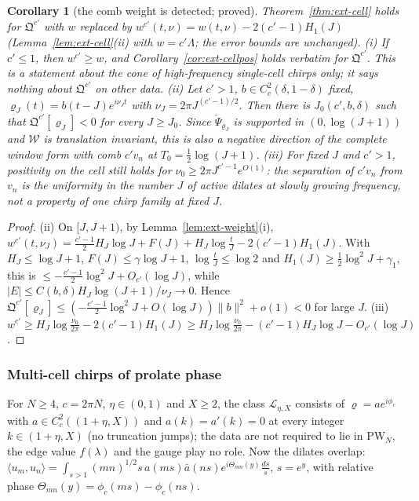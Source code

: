 \documentclass[11pt]{amsart}
\newtheorem{corollary}[theorem]{Corollary}
\theoremstyle{definition}
\theoremstyle{remark}
\begin{document}
\begin{corollary}[the comb weight is detected; proved]\label{cor:ext-cfals}
Theorem~\ref{thm:ext-cell} holds for $\mathfrak Q^{c'}$ with $w$ replaced by $w^{c'}(t,\nu)=w(t,\nu)-2(c'-1)H_1(J)$ (Lemma~\ref{lem:ext-cell}(ii)
with $w=c'\Lambda$; the error bounds are unchanged).
\emph{(i)} If $c'\le1$, then $w^{c'}\ge w$, and Corollary~\ref{cor:ext-cellpos} holds verbatim for $\mathfrak Q^{c'}$. This is a statement
about the cone of high-frequency single-cell chirps only; it says nothing about $\mathfrak Q^{c'}$ on other data.
\emph{(ii)} Let $c'>1$, $b\in C_c^2(\delta,1-\delta)$ fixed, $\varrho_J(t)=b(t-J)e^{i\nu_Jt}$ with $\nu_J=2\pi J^{(c'-1)/2}$. Then there is
$J_0(c',b,\delta)$ such that $\mathfrak Q^{c'}[\varrho_J]<0$ for every $J\ge J_0$. Since $\check\Psi_{\varrho_J}$ is supported in
$(0,\log(J+1))$ and $\mathcal W$ is translation invariant, this is also a negative direction of the complete window form
with comb $c'v_n$ at $T_0=\frac12\log(J+1)$.
\emph{(iii)} For fixed $J$ and $c'>1$, positivity on the cell still holds for $\nu_0\ge2\pi J^{c'-1}e^{O(1)}$: the separation of
$c'v_n$ from $v_n$ is the uniformity in the number $J$ of active dilates at slowly growing frequency, not a property of one
chirp family at fixed $J$.
\end{corollary}
\begin{proof}
(ii) On $[J,J+1)$, by Lemma~\ref{lem:ext-weight}(i),
$w^{c'}(t,\nu_J)=\frac{c'-1}2H_J\log J+F(J)+H_J\log\frac tJ-2(c'-1)H_1(J)$. With $H_J\le\log J+1$, $F(J)\le\gamma\log J+1$,
$\log\frac tJ\le\log2$ and $H_1(J)\ge\frac12\log^2J+\gamma_1$, this is $\le-\frac{c'-1}2\log^2J+O_{c'}(\log J)$, while
$|E|\le C(b,\delta)H_J\log(J+1)/\nu_J\to0$. Hence $\mathfrak Q^{c'}[\varrho_J]\le(-\frac{c'-1}2\log^2J+O(\log J))\|b\|^2+o(1)<0$ for large
$J$. (iii) $w^{c'}\ge H_J\log\frac{\nu_0}{2\pi}-2(c'-1)H_1(J)\ge H_J\log\frac{\nu_0}{2\pi}-(c'-1)H_J\log J-O_{c'}(\log J)$.
\end{proof}

\subsubsection*{Multi-cell chirps of prolate phase}

For $N\ge4$, $c=2\pi N$, $\eta\in(0,1)$ and $X\ge2$, the class $\mathcal L_{\eta,X}$ consists of $\varrho=ae^{i\phi_c}$ with
$a\in C_c^2((1+\eta,X))$ and $a(k)=a'(k)=0$ at every integer $k\in(1+\eta,X)$ (no truncation jumps); the data are not required to
lie in $\mathrm{PW}_N$, the edge value $f(\lambda)$ and the gauge play no role. Now the dilates overlap:
$\langle u_m,u_n\rangle=\int_{s>1}(mn)^{1/2}s\,a(ms)\bar a(ns)e^{i\Theta_{mn}(y)}\frac{ds}s$, $s=e^y$, with relative phase
$\Theta_{mn}(y)=\phi_c(ms)-\phi_c(ns)$.
\end{document}
